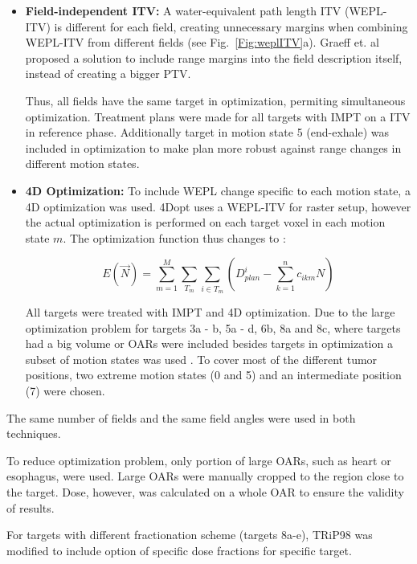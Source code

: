 \documentclass[type=dr, dr=rernat, accentcolor=tud7b,colorbacktitle, bigchapter, openright, twoside, 12pt ]{tudthesis}
\begin{document}
\begin{itemize}
\item \textbf{Field-independent ITV:} A water-equivalent path length ITV (WEPL-ITV) is different for each field, creating unnecessary margins when combining 
WEPL-ITV from different fields (see Fig.~\ref{Fig:weplITV}a). 
Graeff et. al \cite{Graeff2012} proposed a solution to include range margins into the field description itself, instead of creating a bigger PTV. 

Thus, all fields have the same target in optimization, permiting simultaneous optimization. 
Treatment plans were made for all targets with IMPT on a ITV in reference phase. Additionally target in motion state 5 (end-exhale) was included in optimization
to make plan more robust against range changes in different motion states.

\item \textbf{4D Optimization:} To include WEPL change specific to each motion state, a 4D optimization was used. 4Dopt uses a WEPL-ITV for raster setup, 
however the actual optimization is performed on each target voxel in each motion state $m$. The optimization function thus changes to \cite{Graeff2012}:

\begin{equation}
E(\vec{N}) = \sum_{m=1}^{M}\sum_{T_m} \sum_{i\in T_m} \left( D_{plan}^{i} -\sum_{k=1}^n c_{ikm}N\right)
\end{equation}

All targets were treated with IMPT and 4D optimization. Due to the large optimization problem for targets 3a - b, 5a - d, 6b, 8a and 8c, where targets had a big volume or 
OARs were included besides targets in optimization a subset of motion states was used \cite{Graeff2012}. 
To cover most of the different tumor positions, two extreme motion states (0 and 5) and an intermediate position (7) were chosen.

\end{itemize}

The same number of fields and the same field angles were used in both techniques.

To reduce optimization problem, only portion of large OARs, such as heart or esophagus, were used. Large OARs were manually cropped to the region close to the 
target. Dose, however, was calculated on a whole OAR to ensure the validity of results.

For targets with different fractionation scheme (targets 8a-e), TRiP98 was modified to include option of specific dose fractions for specific target.
\end{document}
